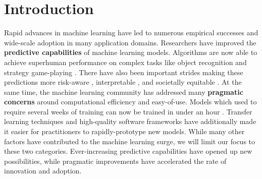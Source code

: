 \chapter{Introduction}
\label{chapt:introduction}









Rapid advances in machine learning have led to numerous empirical successes and wide-scale adoption in many application domains.
Researchers have improved the {\bf predictive capabilities} of machine learning models.
Algorithms are now able to achieve superhuman performance on complex tasks like object recognition \cite{} and strategy game-playing \cite{}.
There have also been important strides making these predictions more risk-aware \cite{}, interpretable \cite{}, and societally equitable \cite{}.
At the same time, the machine learning community has addressed many {\bf pragmatic concerns} around computational efficiency and easy-of-use.
Models which used to require several weeks of training can now be trained in under an hour \cite{}.
Transfer learning techniques \cite{} and high-quality software frameworks have additionally made it easier for practitioners to rapidly-prototype new models.
While many other factors have contributed to the machine learning surge, we will limit our focus to these two categories.
Ever-increasing predictive capabilities have opened up new possibilities, while pragmatic improvements have accelerated the rate of innovation and adoption.

